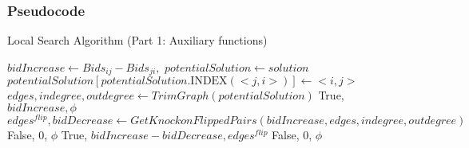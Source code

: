 \documentclass{article}
\begin{document}
\subsubsection{Pseudocode}

\begin{algorithm}[H]
\renewcommand{\thealgorithm}{}
\caption{Local Search Algorithm (Part 1: Auxiliary functions)}
\begin{algorithmic}

    \State $bidIncrease \gets Bids_{ij} - Bids_{ji}, $
    \State $potentialSolution \gets solution$
    \State $potentialSolution[potentialSolution.\textrm{INDEX}(<j,i>)] \gets <i,j>$
    \State $edges, indegree, outdegree \gets TrimGraph(potentialSolution)$
        \State \Return True, $bidIncrease, \phi$
    \EndIf
    \State $edges^{flip}, bidDecrease \gets GetKnockonFlippedPairs(bidIncrease, edges, indegree, outdegree)$
        \State \Return False, 0, $\phi$
    \EndIf
        \State \Return True, $bidIncrease - bidDecrease, edges^{flip}$
    \EndIf
    \State \Return False, 0, $\phi$
\EndFunction

\end{algorithmic}
\end{algorithm}
\newpage
\end{document}
